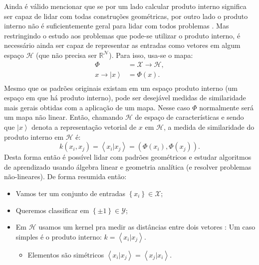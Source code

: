 Ainda é válido mencionar que se por um lado calcular produto interno significa ser capaz de lidar com todas construções geométricas, por outro lado o produto interno não é suficientemente geral para lidar com todos problemas \cite{kernel}. Mas restringindo o estudo aos problemas que pode-se utilizar o produto interno, é necessário  ainda ser capaz de representar as entradas como vetores em algum espaço $\mathcal{H}$ (que não precisa ser $\mathbb{R}^{\mathcal{N}}$). Para isso, usa-se o mapa:
\begin{equation}
\begin{split}
\Phi &  =\mathcal{X}\rightarrow\mathcal{H}, \\
x\rightarrow\left|x\right\rangle  & =\Phi\left(x\right).\\
\end{split} 
\end{equation}
Mesmo que os padrões originais existam em um espaço produto interno (um espaço em que há produto interno), pode ser desejável medidas de similaridade mais gerais obtidas com a aplicação de um mapa. Nesse caso $\Phi$ normalmente será um mapa não linear.  Então, chamando  $\mathcal{H}$  de espaço de características e sendo que  $\left|x\right\rangle $ denota a representação vetorial de $x$  em $\mathcal{H}$, a medida de similaridade do produto interno em $\mathcal{H}$ é:
\begin{equation}
k\left(x_i,x_j\right)=\left\langle x_{i}|x_{j}\right\rangle  =\left( \Phi\left(x_i\right),\Phi\left(x_j\right)\right) 
 . \end{equation}
Desta forma então é possível lidar com padrões geométricos e estudar algoritmos de aprendizado usando álgebra linear e geometria analítica (e resolver problemas não-lineares). De forma resumida então:
\begin{itemize}
\item Vamos ter um conjunto de entradas $\left\{ x_{i}\right\} \in \mathcal{X}$;
\item Queremos classificar em $\left\{ \pm1\right\} \in \mathcal{Y}$;
\item Em $\mathcal{H}$ usamos um kernel pra medir as distâncias entre dois vetores : Um caso simples é o produto interno: $ k=\left\langle x_{i}|x_{j}\right\rangle $.
\begin{itemize}
    \item Elementos são simétricos $\left\langle x_{i}|x_{j}\right\rangle=\left\langle x_{j}|x_{i}\right\rangle$.
\end{itemize}
\end{itemize}


